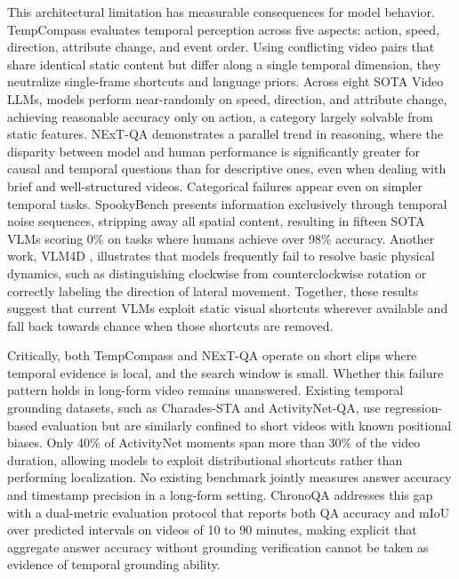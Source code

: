 \documentclass[sigconf,natbib=false,nonacm]{acmart}
\begin{document}
This architectural limitation has measurable consequences for model behavior. TempCompass \cite{tempcompass} evaluates temporal perception across five aspects: action, speed, direction, attribute change, and event order. Using conflicting video pairs that share identical static content but differ along a single temporal dimension, they neutralize single-frame shortcuts and language priors. Across eight SOTA Video LLMs, models perform near-randomly on speed, direction, and attribute change, achieving reasonable accuracy only on action, a category largely solvable from static features. NExT-QA \cite{nextqa} demonstrates a parallel trend in reasoning, where the disparity between model and human performance is significantly greater for causal and temporal questions than for descriptive ones, even when dealing with brief and well-structured videos. Categorical failures appear even on simpler temporal tasks. SpookyBench \cite{spookybench} presents information exclusively through temporal noise sequences, stripping away all spatial content, resulting in fifteen SOTA VLMs scoring 0\% on tasks where humans achieve over 98\% accuracy. Another work, VLM4D \cite{vlm4d}, illustrates that models frequently fail to resolve basic physical dynamics, such as distinguishing clockwise from counterclockwise rotation or correctly labeling the direction of lateral movement. Together, these results suggest that current VLMs exploit static visual shortcuts wherever available and fall back towards chance when those shortcuts are removed.


Critically, both TempCompass and NExT-QA operate on short clips where temporal evidence is local, and the search window is small. Whether this failure pattern holds in long-form video remains unanswered. Existing temporal grounding datasets, such as Charades-STA\cite{charades} and ActivityNet-QA\cite{activitynetqa}, use regression-based evaluation but are similarly confined to short videos with known positional biases. Only 40\% of ActivityNet moments span more than 30\% of the video duration, allowing models to exploit distributional shortcuts rather than performing localization. No existing benchmark jointly measures answer accuracy and timestamp precision in a long-form setting. ChronoQA addresses this gap with a dual-metric evaluation protocol that reports both QA accuracy and mIoU over predicted intervals on videos of 10 to 90 minutes, making explicit that aggregate answer accuracy without grounding verification cannot be taken as evidence of temporal grounding ability.
\end{document}
